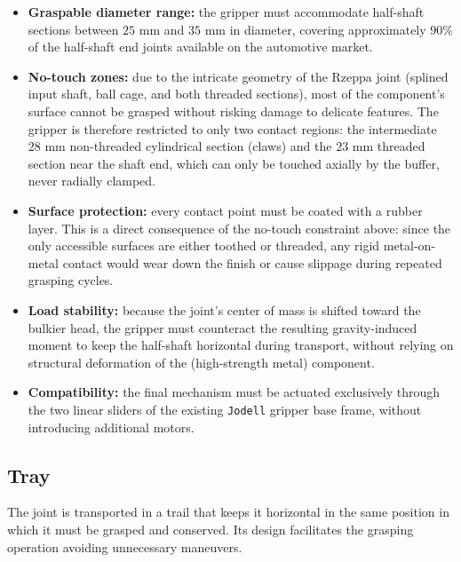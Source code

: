 \begin{itemize}
    \item \textbf{Graspable diameter range:} the gripper must accommodate half-shaft sections between $25\text{ mm}$ and $35\text{ mm}$ in diameter, covering approximately $90\%$ of the half-shaft end joints available on the automotive market.
    \item \textbf{No-touch zones:} due to the intricate geometry of the Rzeppa joint (splined input shaft, ball cage, and both threaded sections), most of the component's surface cannot be grasped without risking damage to delicate features. The gripper is therefore restricted to only two contact regions: the intermediate $28\text{ mm}$ non-threaded cylindrical section (claws) and the $23\text{ mm}$ threaded section near the shaft end, which can only be touched axially by the buffer, never radially clamped.
    \item \textbf{Surface protection:} every contact point must be coated with a rubber layer. This is a direct consequence of the no-touch constraint above: since the only accessible surfaces are either toothed or threaded, any rigid metal-on-metal contact would wear down the finish or cause slippage during repeated grasping cycles.
    \item \textbf{Load stability:} because the joint's center of mass is shifted toward the bulkier head, the gripper must counteract the resulting gravity-induced moment to keep the half-shaft horizontal during transport, without relying on structural deformation of the (high-strength metal) component.
    \item \textbf{Compatibility:} the final mechanism must be actuated exclusively through the two linear sliders of the existing \texttt{Jodell} gripper base frame, without introducing additional motors.
\end{itemize}

\subsection{Tray}
The joint is transported in a trail that keeps it horizontal in the same position in which it must be grasped and conserved. Its design facilitates the grasping operation avoiding unnecessary maneuvers.

